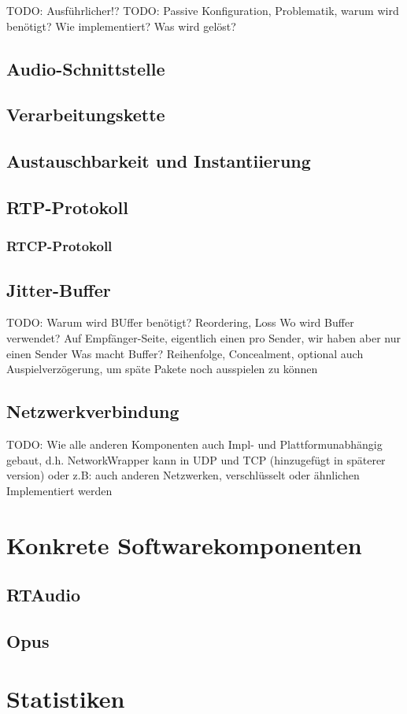 TODO: Ausführlicher!?
TODO: Passive Konfiguration, Problematik, warum wird benötigt? Wie implementiert? Was wird gelöst?
\subsection{Audio-Schnittstelle}
\subsection{Verarbeitungskette}
\subsection{Austauschbarkeit und Instantiierung}
\subsection{RTP-Protokoll}
\subsubsection{RTCP-Protokoll}
\subsection{Jitter-Buffer}
TODO: Warum wird BUffer benötigt? Reordering, Loss
Wo wird Buffer verwendet? Auf Empfänger-Seite, eigentlich einen pro Sender, wir haben aber nur einen Sender
Was macht Buffer? Reihenfolge, Concealment, optional auch Auspielverzögerung, um späte Pakete noch ausspielen zu können
\subsection{Netzwerkverbindung}
TODO: Wie alle anderen Komponenten auch Impl- und Plattformunabhängig gebaut, d.h. NetworkWrapper kann in UDP und TCP (hinzugefügt in späterer version) oder z.B: auch anderen Netzwerken, verschlüsselt oder ähnlichen Implementiert werden
\section{Konkrete Softwarekomponenten}
\subsection{RTAudio}
\subsection{Opus}
\section{Statistiken}
